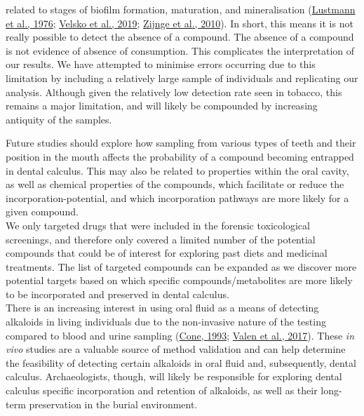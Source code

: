 \documentclass[
  b5paper,
]{book}
\begin{document}
related to stages of biofilm formation, maturation, and mineralisation
(\protect\hyperlink{ref-lustmannScanningElectron1976}{Lustmann et al.,
1976}; \protect\hyperlink{ref-velskoMicrobialDifferences2019}{Velsko et
al., 2019}; \protect\hyperlink{ref-zijngeBiofilmArchitecture2010}{Zijnge
et al., 2010}). In short, this means it is not really possible to detect
the absence of a compound. The absence of a compound is not evidence of
absence of consumption. This complicates the interpretation of our
results. We have attempted to minimise errors occurring due to this
limitation by including a relatively large sample of individuals and
replicating our analysis. Although given the relatively low detection
rate seen in tobacco, this remains a major limitation, and will likely
be compounded by increasing antiquity of the samples.

Future studies should explore how sampling from various types of teeth
and their position in the mouth affects the probability of a compound
becoming entrapped in dental calculus. This may also be related to
properties within the oral cavity, as well as chemical properties of the
compounds, which facilitate or reduce the incorporation-potential, and
which incorporation pathways are more likely for a given compound.\\
We only targeted drugs that were included in the forensic toxicological
screenings, and therefore only covered a limited number of the potential
compounds that could be of interest for exploring past diets and
medicinal treatments. The list of targeted compounds can be expanded as
we discover more potential targets based on which specific
compounds/metabolites are more likely to be incorporated and preserved
in dental calculus.\\
There is an increasing interest in using oral fluid as a means of
detecting alkaloids in living individuals due to the non-invasive nature
of the testing compared to blood and urine sampling
(\protect\hyperlink{ref-coneSalivaTesting1993}{Cone, 1993};
\protect\hyperlink{ref-valenDetermination212017}{Valen et al., 2017}).
These \emph{in vivo} studies are a valuable source of method validation
and can help determine the feasibility of detecting certain alkaloids in
oral fluid and, subsequently, dental calculus. Archaeologists, though,
will likely be responsible for exploring dental calculus specific
incorporation and retention of alkaloids, as well as their long-term
preservation in the burial environment.
\end{document}
